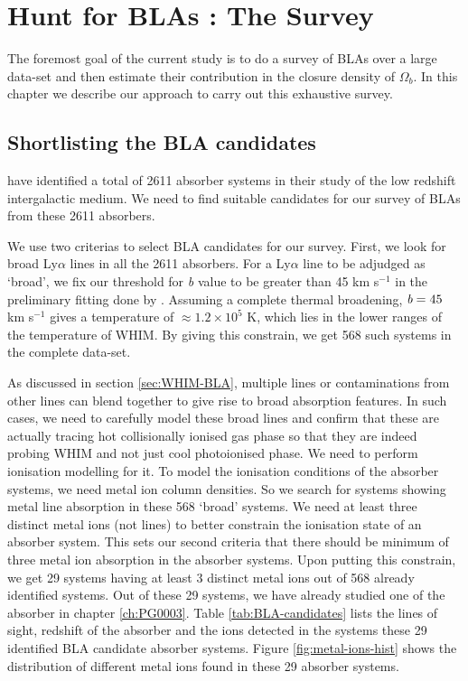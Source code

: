 \chapter{Hunt for BLAs : The Survey} \label{ch:Survey}

The foremost goal of the current study is to do a survey of BLAs over a large data-set and then estimate their contribution in the closure density of $\Omega_b$. In this chapter we describe our approach to carry out this exhaustive survey.

\section{Shortlisting the BLA candidates} \label{sec:BLA-candidates}

\citet{danforth-2016} have identified a total of 2611 absorber systems in their study of the low redshift intergalactic medium. We need to find suitable candidates for our survey of BLAs from these 2611 absorbers.

We use two criterias to select BLA candidates for our survey. First, we look for broad Ly$\alpha$ lines in all the 2611 absorbers. For a Ly$\alpha$ line to be adjudged as `broad', we fix our threshold for \emph{b} value to be greater than 45 km s$^{-1}$ in the preliminary fitting done by \citet{danforth-2016}. Assuming a complete thermal broadening, $\emph{b}=45$ km s$^{-1}$ gives a temperature of $\approx 1.2 \times 10^5$ K, which lies in the lower ranges of the temperature of WHIM. By giving this constrain, we get 568 such systems in the complete data-set.

As discussed in section \ref{sec:WHIM-BLA}, multiple lines or contaminations from other lines can blend together to give rise to broad absorption features. In such cases, we need to carefully model these broad lines and confirm that these are actually tracing hot collisionally ionised gas phase so that they are indeed probing WHIM and not just cool photoionised phase. We need to perform ionisation modelling for it. To model the ionisation conditions of the absorber systems, we need metal ion column densities. So we search for systems showing metal line absorption in these 568 `broad' systems. We need at least three distinct metal ions (not lines) to better constrain the ionisation state of an absorber system. This sets our second criteria that there should be minimum of three metal ion absorption in the absorber systems. Upon putting this constrain, we get 29 systems having at least 3 distinct metal ions out of 568 already identified systems. Out of these 29 systems, we have already studied one of the absorber in chapter \ref{ch:PG0003}. Table \ref{tab:BLA-candidates} lists the lines of sight, redshift of the absorber and the ions detected in the systems these 29 identified BLA candidate absorber systems. Figure \ref{fig:metal-ions-hist} shows the distribution of different metal ions found in these 29 absorber systems. 


